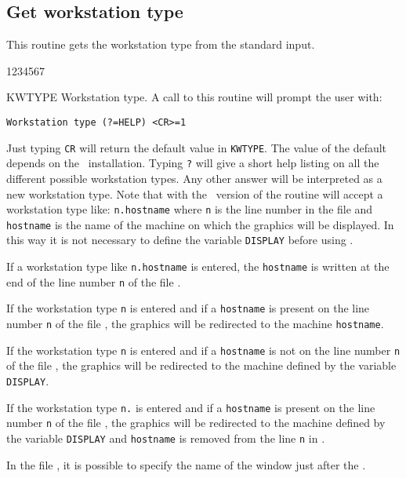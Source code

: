 \subsection{Get workstation type}
\Action
This routine gets the workstation type from the standard input.
\Pdesc
\begin{DLtt}{1234567}
\item[KWTYPE] Workstation type. A call to this routine will prompt the user
              with:
\begin{verbatim}
Workstation type (?=HELP) <CR>=1
\end{verbatim}
Just typing {\tt CR} will return the default value in {\tt KWTYPE}. The value of
the default depends on the \HIGZ~installation. Typing {\tt ?} will give a short
help listing on all the different possible workstation types. Any other answer
will be interpreted as a new workstation type. Note that with the ~version
of \HIGZ{} the routine  will accept a workstation type like:
{\tt n.hostname} where {\tt n} is the line number in the file \HW{} and
{\tt hostname} is the name of the machine on which the graphics will be
displayed. In this way it is not necessary to define the variable {\tt DISPLAY}
before using \HIGZ.

\begin{ULc}
\item   If a workstation type like {\tt n.hostname} is entered,
        the {\tt hostname} is written at the end of the line number {\tt n} 
        of the file \HW.
\item   If the workstation type {\tt n} is entered and if a {\tt hostname} is
        present on the line number {\tt n} of the fi\-le \HW, the graphics will 
        be redirected to the machine
        {\tt hostname}.
\item   If the workstation type {\tt n} is entered and if a {\tt hostname} is
        not on the li\-ne number {\tt n} of the file  \HW, the gra\-phics 
        will be redirected to the ma\-chi\-ne de\-fi\-ned by the va\-ria\-ble 
        {\tt DIS\-PLAY}.
\item   If the workstation type {\tt n.} is entered and if a {\tt hostname} is
        present on the line number {\tt n} of the file \HW, the graphics  will
        be redirected
        to the ma\-chi\-ne de\-fi\-n\-ed by the va\-ria\-ble {\tt DISPLAY} and
        {\tt hostname} is re\-mo\-ved from the line {\tt n} in \HW.
\end{ULc}
\end{DLtt}
\Remark
In the file \HW, it is possible to specify the name of the window just after
the .
%
\newpage

